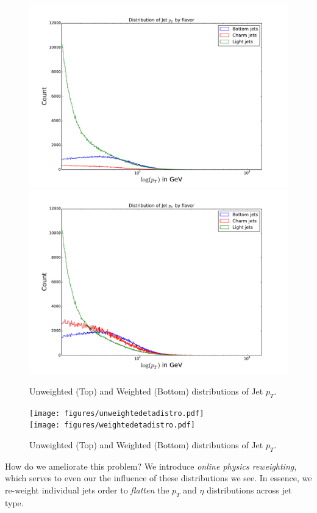 \begin{figure}
\includegraphics[width=\textwidth]{figures/unweightedpTdistro.pdf}\\
\includegraphics[width=\textwidth]{figures/weightedpTdistro.pdf}
\caption[The ATLAS detector]{Unweighted (Top) and Weighted (Bottom) distributions of Jet $p_T$.
\label{fig:pT}}
\end{figure}
\begin{figure}
\texttt{[image: figures/unweightedetadistro.pdf]}\\
\texttt{[image: figures/weightedetadistro.pdf]}
\caption[The ATLAS detector]{Unweighted (Top) and Weighted (Bottom) distributions of Jet $p_T$.
\label{fig:eta}}
\end{figure}


How do we ameliorate this problem? We introduce \emph{online physics reweighting}, which serves to even our the influence of these distributions we see. In essence, we re-weight individual jets order to \emph{flatten} the $p_T$ and $\eta$ distributions across jet type. 

